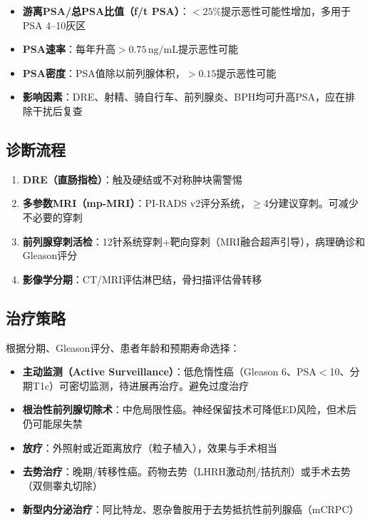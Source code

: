 \begin{itemize}[leftmargin=2cm]
	\item \textbf{游离PSA/总PSA比值（f/t PSA）}：$<25\%$提示恶性可能性增加，多用于PSA 4--10灰区
	\item \textbf{PSA速率}：每年升高$>0.75\,\mathrm{ng/mL}$提示恶性可能
	\item \textbf{PSA密度}：PSA值除以前列腺体积，$>0.15$提示恶性可能
	\item \textbf{影响因素}：DRE、射精、骑自行车、前列腺炎、BPH均可升高PSA，应在排除干扰后复查
\end{itemize}

\subsection{诊断流程}

\begin{enumerate}
	\item \textbf{DRE（直肠指检）}：触及硬结或不对称肿块需警惕
	\item \textbf{多参数MRI（mp-MRI）}：PI-RADS v2评分系统，$\geq$4分建议穿刺。可减少不必要的穿刺
	\item \textbf{前列腺穿刺活检}：12针系统穿刺+靶向穿刺（MRI融合超声引导），病理确诊和Gleason评分
	\item \textbf{影像学分期}：CT/MRI评估淋巴结，骨扫描评估骨转移
\end{enumerate}

\subsection{治疗策略}

根据分期、Gleason评分、患者年龄和预期寿命选择：

\begin{itemize}[leftmargin=2cm]
	\item \textbf{主动监测（Active Surveillance）}：低危惰性癌（Gleason 6、PSA$<$10、分期T1c）可密切监测，待进展再治疗。避免过度治疗
	\item \textbf{根治性前列腺切除术}：中危局限性癌。神经保留技术可降低ED风险，但术后仍可能尿失禁
	\item \textbf{放疗}：外照射或近距离放疗（粒子植入），效果与手术相当
	\item \textbf{去势治疗}：晚期/转移性癌。药物去势（LHRH激动剂/拮抗剂）或手术去势（双侧睾丸切除）
	\item \textbf{新型内分泌治疗}：阿比特龙、恩杂鲁胺用于去势抵抗性前列腺癌（mCRPC）
\end{itemize}

